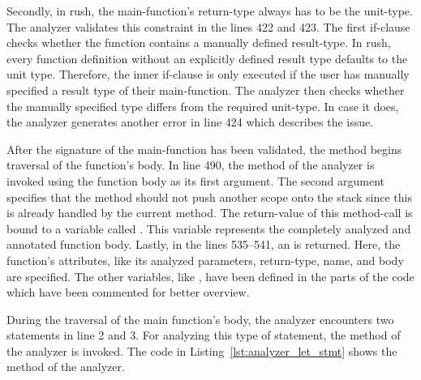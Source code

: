 Secondly, in rush, the main-function's return-type always has to be the unit-type.
The analyzer validates this constraint in the lines 422 and 423.
The first if-clause checks whether the function contains a manually defined result-type.
In rush, every function definition without an explicitly defined result type defaults to the unit type.
Therefore, the inner if-clause is only executed if the user has manually specified a result type of their main-function.
The analyzer then checks whether the manually specified type differs from the required unit-type.
In case it does, the analyzer generates another error in line 424 which describes the issue.

After the signature of the main-function has been validated, the method begins traversal of the function's body.
In line 490, the  method of the analyzer is invoked using the function body as its first argument.
The second argument specifies that the method should not push another scope onto the stack since this is already handled by the current method.
The return-value of this method-call is bound to a variable called .
This variable represents the completely analyzed and annotated function body.
Lastly, in the lines 535--541, an  is returned.
Here, the function's attributes, like its analyzed parameters, return-type, name, and body are specified.
The other variables, like , have been defined in the parts of the code which have been commented for better overview.

During the traversal of the main function's body, the analyzer encounters two  statements in line 2 and 3.
For analyzing this type of statement, the  method of the analyzer is invoked.
The code in Listing~\ref{lst:analyzer_let_stmt} shows the  method of the analyzer.


